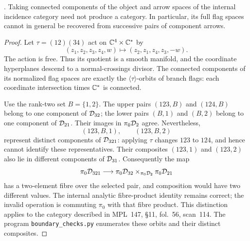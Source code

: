 \begin{proposition}
\label{P4a1}
. Taking connected components of the object and arrow spaces of the internal incidence category need not produce a category. In particular, its full flag spaces cannot in general be recovered from successive pairs of component arrows.
\end{proposition}
\begin{proof}
Let $\tau=(12)(34)$ act on $\mathbb C^4\times\mathbb C^*$ by
\[
 (z_1,z_2,z_3,z_4,w)\longmapsto(z_2,z_1,z_4,z_3,-w).
\]
The action is free. Thus its quotient is a smooth manifold, and the coordinate hyperplanes descend to a normal-crossings divisor. The connected components of its normalized flag spaces are exactly the $\langle\tau\rangle$-orbits of branch flags: each coordinate intersection times $\mathbb C^*$ is connected.

Use the rank-two set $B=\{1,2\}$. The upper pairs $(123,B)$ and $(124,B)$ belong to one component of $\mathcal D_{32}$; the lower pairs $(B,1)$ and $(B,2)$ belong to one component of $\mathcal D_{21}$. Their images in $\pi_0\mathcal D_2$ agree. Nevertheless,
\[
 (123,B,1),\qquad (123,B,2)
\]
represent distinct components of $\mathcal D_{321}$: applying $\tau$ changes $123$ to $124$, and hence cannot identify these representatives. Their composites $(123,1)$ and $(123,2)$ also lie in different components of $\mathcal D_{31}$. Consequently the map
\[
 \pi_0\mathcal D_{321}\longrightarrow
 \pi_0\mathcal D_{32}\times_{\pi_0\mathcal D_2}\pi_0\mathcal D_{21}
\]
has a two-element fibre over the selected pair, and composition would have two different values. The internal analytic fibre-product identity remains correct; the invalid operation is commuting $\pi_0$ with that fibre product. This distinction applies to the category described in MPL~147, \S11, fol.~56, scan~114. The program \texttt{boundary\_checks.py} enumerates these orbits and their distinct composites.
\end{proof}

